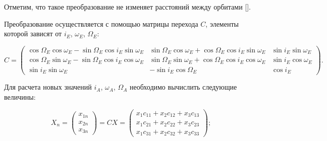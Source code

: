 Отметим, что такое преобразование не изменяет расстояний между орбитами []. 

Преобразование осуществляется с помощью матрицы перехода $C$, элементы которой зависят от $i_E$, $\omega_E$, $\Omega_E$:

\begin{scriptsize}

\begin{equation*}

C=	\begin{pmatrix}

		\cos \Omega_E \cos \omega_E - \sin \Omega_E \cos i_E \sin \omega_E & \sin \Omega_E \cos \omega_E + \cos \Omega_E \cos i_E \sin \omega_E & \sin i_E \sin \omega_E \\ 

		\cos \Omega_E \sin \omega_E - \sin \Omega_E \cos i_E \cos \omega_E & \sin \Omega_E \sin \omega_E + \cos \Omega_E \cos i_E \cos \omega_E & 

		\sin i_E \cos \omega_E \\ 

		\sin i_E \sin \omega_E & -\sin i_E \cos \Omega_E & \cos i_E 

	\end{pmatrix}.

\end{equation*}

\end{scriptsize}



Для расчета новых значений $i_A$, $\omega_A$, $\Omega_A$ необходимо вычислить следующие величины:

\begin{equation*}

	X_n = 

		\begin{pmatrix} 

			x_{1n} \\ 

			x_{2n} \\ 

			x_{3n} 

		\end{pmatrix} 

		= CX = 

		\begin{pmatrix} 

			x_{1}c_{11} + x_{2}c_{12} + x_{3}c_{13} \\ 

			x_{1}c_{21} + x_{2}c_{22} + x_{3}c_{23} \\ 

			x_{1}c_{31} + x_{2}c_{32} + x_{3}c_{33} 

		\end{pmatrix};

\end{equation*}




